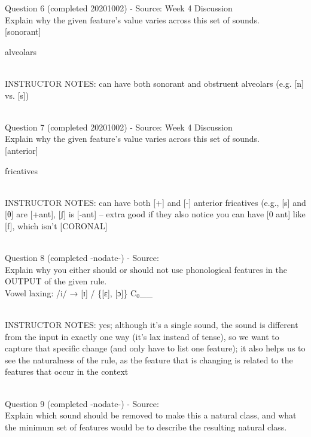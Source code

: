 \documentclass[12pt]{article}
\begin{document}
{\large Question 6} (completed 20201002) - Source: Week 4 Discussion\\

Explain why the given feature's value varies across this set of sounds.\\

{[sonorant]}

alveolars


~\\
INSTRUCTOR NOTES: can have both sonorant and obstruent alveolars (e.g. [n] vs. [s])


~\\

{\large Question 7} (completed 20201002) - Source: Week 4 Discussion\\

Explain why the given feature's value varies across this set of sounds.\\

{[anterior]}

fricatives


~\\
INSTRUCTOR NOTES: can have both [+] and [-] anterior fricatives (e.g., [s] and [θ] are [+ant], [ʃ] is [-ant] -- extra good if they also notice you can have [0 ant] like [f], which isn't [CORONAL]


~\\

{\large Question 8} (completed -nodate-) - Source: \\

Explain why you either should or should not use phonological features in the OUTPUT of the given rule.\\

Vowel laxing: /i/ → {[ɪ]} / \{{[ɛ]}, {[ɔ]}\} C$_0$\_\_


~\\
INSTRUCTOR NOTES: yes; although it's a single sound, the sound is different from the input in exactly one way (it's lax instead of tense), so we want to capture that specific change (and only have to list one feature); it also helps us to see the naturalness of the rule, as the feature that is changing is related to the features that occur in the context


~\\

{\large Question 9} (completed -nodate-) - Source: \\

Explain which sound should be removed to make this a natural class, and what the minimum set of features would be to describe the resulting natural class.\\
\end{document}
